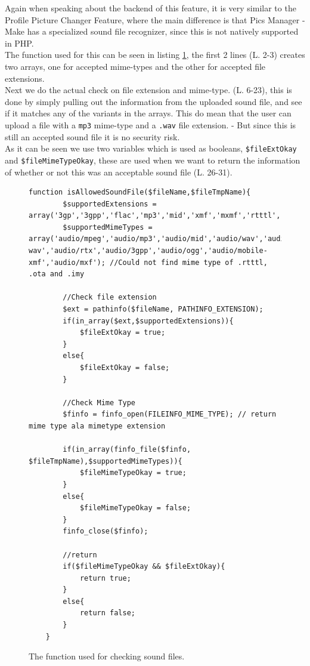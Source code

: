 Again when speaking about the backend of this feature, it is very similar to the Profile Picture Changer Feature, where the main difference is that Pics Manager - Make has a specialized sound file recognizer, since this is not natively supported in PHP.\\
The function used for this can be seen in listing \ref{lst:soundFileRecognizer}, the first 2 lines (L. 2-3) creates two arrays, one for accepted mime-types and the other for accepted file extensions.\\
Next we do the actual check on file extension and mime-type. (L. 6-23), this is done by simply pulling out the information from the uploaded sound file, and see if it matches any of the variants in the arrays. This do mean that the user can upload a file with a \texttt{mp3} mime-type and a \texttt{.wav} file extension. - But since this is still an accepted sound file it is no security risk.\\
As it can be seen we use two variables which is used as booleans, \texttt{\$fileExtOkay} and \texttt{\$fileMimeTypeOkay}, these are used when we want to return the information of whether or not this was an acceptable sound file (L. 26-31).

\lstset{language=PHP}
\begin{figure}[htbp]
\begin{lstlisting}[firstline=1]
	function isAllowedSoundFile($fileName,$fileTmpName){
		$supportedExtensions = array('3gp','3gpp','flac','mp3','mid','xmf','mxmf','rtttl','rtx','ota','imy','ogg','wav');
		$supportedMimeTypes = array('audio/mpeg','audio/mp3','audio/mid','audio/wav','audio/x-wav','audio/rtx','audio/3gpp','audio/ogg','audio/mobile-xmf','audio/mxf'); //Could not find mime type of .rtttl, .ota and .imy
		
		//Check file extension
		$ext = pathinfo($fileName, PATHINFO_EXTENSION);
		if(in_array($ext,$supportedExtensions)){
			$fileExtOkay = true;
		}
		else{
			$fileExtOkay = false;
		}
		
		//Check Mime Type
		$finfo = finfo_open(FILEINFO_MIME_TYPE); // return mime type ala mimetype extension
		
		if(in_array(finfo_file($finfo, $fileTmpName),$supportedMimeTypes)){
			$fileMimeTypeOkay = true;
		}
		else{
			$fileMimeTypeOkay = false;
		}
		finfo_close($finfo);
		
		//return
		if($fileMimeTypeOkay && $fileExtOkay){
			return true;
		}
		else{
			return false;
		}
	}
\end{lstlisting}
\caption{The function used for checking sound files.}
\label{lst:soundFileRecognizer}
\end{figure}


